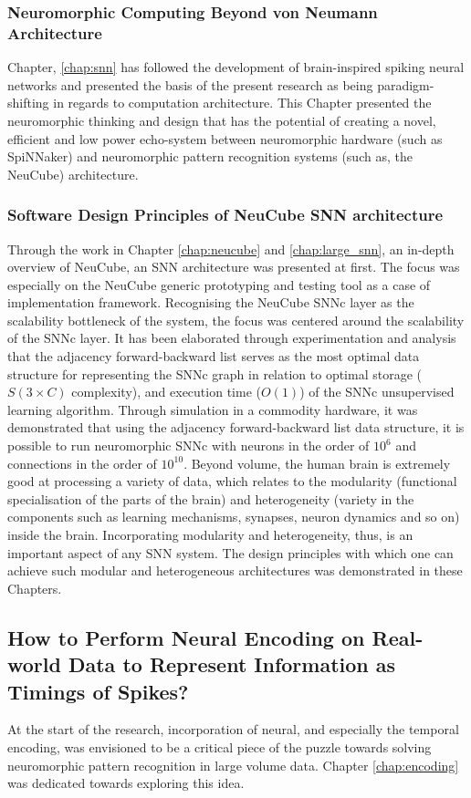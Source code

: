 \subsubsection{Neuromorphic Computing Beyond von Neumann Architecture}
Chapter, \ref{chap:snn} has followed the development of brain-inspired spiking neural networks and presented the basis of the present research as being paradigm-shifting in regards to computation architecture. This Chapter presented the neuromorphic thinking and design that has the potential of creating a novel, efficient and low power echo-system between neuromorphic hardware (such as SpiNNaker) and neuromorphic pattern recognition systems (such as, the NeuCube) architecture. 
	
\subsubsection{Software Design Principles of NeuCube SNN architecture} 
Through the work in Chapter \ref{chap:neucube} and \ref{chap:large_snn}, an in-depth overview of NeuCube, an SNN architecture was presented at first. The focus was especially on the NeuCube generic prototyping and testing tool as a case of implementation framework. Recognising the NeuCube SNNc layer as the scalability bottleneck of the system, the focus was centered around the scalability of the SNNc layer. It has been elaborated through experimentation and analysis that the adjacency forward-backward list serves as the most optimal data structure for representing the SNNc graph in relation to optimal storage ($S(3\times C)$ complexity), and execution time ($O(1)$) of the SNNc unsupervised learning algorithm. Through simulation in a commodity hardware, it was demonstrated that using the adjacency forward-backward list data structure, it is possible to run neuromorphic SNNc with neurons in the order of $10^6$ and connections in the order of $10^{10}$. Beyond volume, the human brain is extremely good at processing a variety of data, which relates to the modularity (functional specialisation of the parts of the brain) and heterogeneity (variety in the components such as learning mechanisms, synapses, neuron dynamics and so on) inside the brain. Incorporating modularity and heterogeneity, thus, is an important aspect of any SNN system. The design principles with which one can achieve such modular and heterogeneous architectures was demonstrated in these Chapters.  
	
\subsection{How to Perform Neural Encoding on Real-world Data to Represent Information as Timings of Spikes?}
At the start of the research, incorporation of neural, and especially the temporal encoding, was envisioned to be a critical piece of the puzzle towards solving neuromorphic pattern recognition in large volume data. Chapter \ref{chap:encoding} was dedicated towards exploring this idea. 

